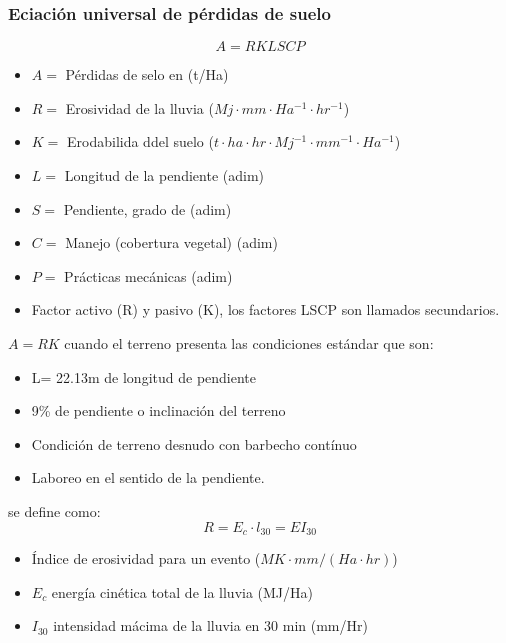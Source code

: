     \subsubsection{Eciación universal de pérdidas de suelo}
    \begin{equation}
        A = RKLSCP
    \end{equation}
    \begin{notation}
        \begin{itemize}
            \item $A=$ Pérdidas de selo en (t/Ha)
            \item $R=$ Erosividad de la lluvia ($Mj\cdot  mm\cdot  Ha^{-1}\cdot hr^{-1}$)
            \item $K=$ Erodabilida ddel suelo ($t\cdot ha\cdot  hr\cdot  Mj^{-1}\cdot mm^{-1}\cdot Ha^{-1}$)
            \item $L=$ Longitud de la pendiente (adim)
            \item $S=$ Pendiente, grado de (adim)
            \item $C=$ Manejo (cobertura vegetal) (adim)
            \item $P=$ Prácticas mecánicas (adim)
            \item Factor activo (R) y pasivo (K), los factores LSCP son llamados secundarios.
        \end{itemize}
    \end{notation}
    $A=RK$ cuando el terreno presenta las condiciones estándar que son:
    \begin{itemize}
        \item L= 22.13m de longitud de pendiente
        \item 9\% de pendiente o inclinación del terreno
        \item Condición de terreno desnudo con barbecho contínuo
        \item Laboreo en el sentido de la pendiente.
    \end{itemize}
    se define como:
    \begin{equation}
        R = E_c\cdot l_{30} = EI_{30}
    \end{equation}
    \begin{notation}
        \begin{itemize}
            \item Índice de erosividad para un evento ($MK\cdot mm / (Ha\cdot hr)$)
            \item $E_c$ energía cinética total de la lluvia (MJ/Ha)
            \item $I_{30}$ intensidad mácima de la lluvia en 30 min (mm/Hr)
        \end{itemize}
    \end{notation}
